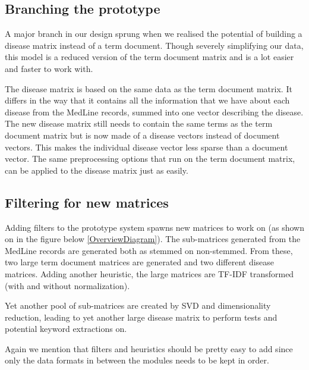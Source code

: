 \subsection{Branching the prototype\label{DiseaseMatrix}}

A major branch in our design sprung when we realised the potential of
building a disease matrix instead of a term document. Though severely
simplifying our data, this model is a reduced version of the term
document matrix and is a lot easier and faster to work with.

The disease matrix is based on the same data as the term document
matrix. It differs in the way that it contains all the information
that we have about each disease from the MedLine records, summed into
one vector describing the disease. The new disease matrix still needs to
contain the same terms as the term document matrix but is now made of
a disease vectors instead of document vectors. This makes the
individual disease vector less sparse than a document vector. The same
preprocessing options that run on the term document matrix, can be
applied to the disease matrix just as easily.

\subsection{Filtering for new matrices\label{FilteringMatrix}}

Adding filters to the prototype system spawns new matrices to work on
(as shown on in the figure below \ref{OverviewDiagram}). The
sub-matrices generated from the MedLine records are generated both as
stemmed on non-stemmed. From these, two large term document matrices
are generated and two different disease matrices. Adding another
heuristic, the large matrices are TF-IDF transformed (with and without
normalization).

Yet another pool of sub-matrices are created by SVD and dimensionality
reduction, leading to yet another large disease matrix to perform
tests and potential keyword extractions on.

Again we mention that filters and heuristics should be pretty easy to
add since only the data formats in between the modules needs to be
kept in order.

